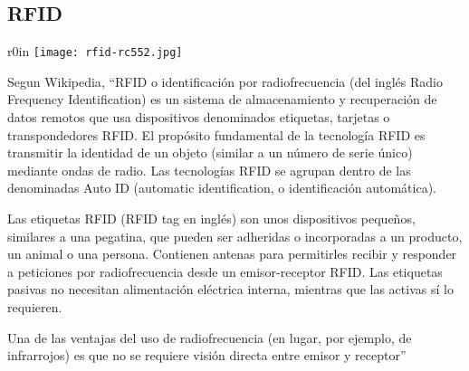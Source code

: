 \documentclass[../informe_krapp.tex]{subfiles}
\begin{document}










%
%
%
\subsection{RFID}
\begin{wrapfigure}{r}{0in}
	\centering
	\texttt{[image: rfid-rc552.jpg]}
\end{wrapfigure}

Segun Wikipedia\cite{wikipedia_rfid_es}, ``RFID o identificación por radiofrecuencia
(del inglés Radio Frequency Identification) es un sistema de almacenamiento y recuperación
de datos remotos que usa dispositivos denominados etiquetas, tarjetas o transpondedores
RFID. El propósito fundamental de la tecnología RFID es transmitir la identidad de
un objeto (similar a un número de serie único) mediante ondas de radio. Las tecnologías
RFID se agrupan dentro de las denominadas Auto ID (automatic identification, o identificación
automática).

Las etiquetas RFID (RFID tag en inglés) son unos dispositivos pequeños, similares
a una pegatina, que pueden ser adheridas o incorporadas a un producto, un animal
o una persona. Contienen antenas para permitirles recibir y responder a peticiones
por radiofrecuencia desde un emisor-receptor RFID. Las etiquetas pasivas no necesitan
alimentación eléctrica interna, mientras que las activas sí lo requieren.

Una de las ventajas del uso de radiofrecuencia (en lugar, por ejemplo, de infrarrojos) es que no se requiere visión directa entre emisor y receptor''
\end{document}

